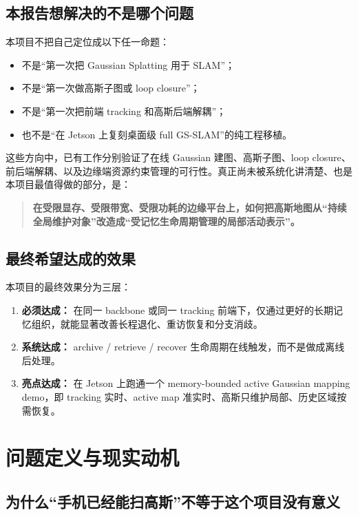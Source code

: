 \documentclass[12pt]{article}
\begin{document}
\subsection{本报告想解决的不是哪个问题}

本项目不把自己定位成以下任一命题：
\begin{itemize}
  \item 不是“第一次把 Gaussian Splatting 用于 SLAM”；
  \item 不是“第一次做高斯子图或 loop closure”；
  \item 不是“第一次把前端 tracking 和高斯后端解耦”；
  \item 也不是“在 Jetson 上复刻桌面级 full GS-SLAM”的纯工程移植。
\end{itemize}

这些方向中，已有工作分别验证了在线 Gaussian 建图、高斯子图、loop closure、前后端解耦、以及边缘端资源约束管理的可行性。真正尚未被系统化讲清楚、也是本项目最值得做的部分，是：
\begin{quote}
\textbf{在受限显存、受限带宽、受限功耗的边缘平台上，如何把高斯地图从“持续全局维护对象”改造成“受记忆生命周期管理的局部活动表示”。}
\end{quote}

\subsection{最终希望达成的效果}

本项目的最终效果分为三层：
\begin{enumerate}
  \item \textbf{必须达成：} 在同一 backbone 或同一 tracking 前端下，仅通过更好的长期记忆组织，就能显著改善长程退化、重访恢复和分支消歧。
  \item \textbf{系统达成：} archive / retrieve / recover 生命周期在线触发，而不是做成离线后处理。
  \item \textbf{亮点达成：} 在 Jetson 上跑通一个 memory-bounded active Gaussian mapping demo，即 tracking 实时、active map 准实时、高斯只维护局部、历史区域按需恢复。
\end{enumerate}

\section{问题定义与现实动机}

\subsection{为什么“手机已经能扫高斯”不等于这个项目没有意义}
\end{document}
